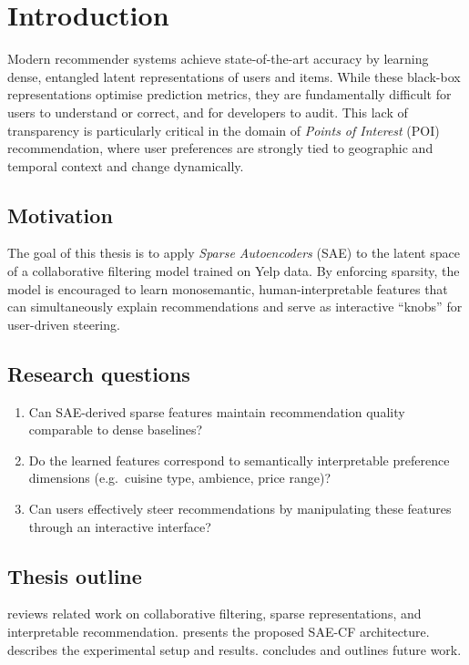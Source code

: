 \chapter{Introduction}
\label{chap:introduction}


Modern recommender systems achieve state-of-the-art accuracy by learning dense,
entangled latent representations of users and items.
While these black-box representations optimise prediction metrics, they are
fundamentally difficult for users to understand or correct, and for developers
to audit.
This lack of transparency is particularly critical in the domain of
\emph{Points of Interest} (POI) recommendation, where user preferences are
strongly tied to geographic and temporal context and change dynamically.

\section{Motivation}


The goal of this thesis is to apply \emph{Sparse Autoencoders} (SAE) to the
latent space of a collaborative filtering model trained on Yelp data.
By enforcing sparsity, the model is encouraged to learn monosemantic,
human-interpretable features that can simultaneously explain recommendations
and serve as interactive ``knobs'' for user-driven steering.

\section{Research questions}

\begin{enumerate}
  \item Can SAE-derived sparse features maintain recommendation quality comparable
        to dense baselines?
  \item Do the learned features correspond to semantically interpretable
        preference dimensions (e.g.\ cuisine type, ambience, price range)?
  \item Can users effectively steer recommendations by manipulating these features
        through an interactive interface?
\end{enumerate}

\section{Thesis outline}

 reviews related work on collaborative filtering,
sparse representations, and interpretable recommendation.
 presents the proposed SAE-CF architecture.
 describes the experimental setup and results.
 concludes and outlines future work.
